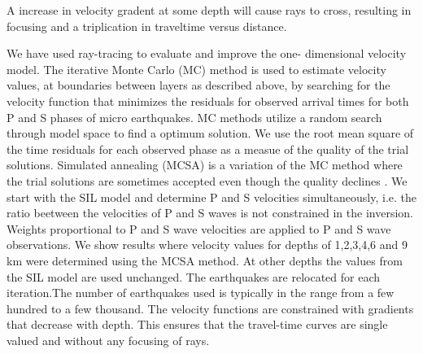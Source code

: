 \documentclass[extra]{gji}
\begin{document}
A increase in velocity gradent at some depth will cause rays to cross, resulting in 
focusing and a triplication in 
traveltime versus distance.

We have  used ray-tracing to evaluate and improve the one-
dimensional velocity model. The iterative Monte Carlo (MC) method is used
to estimate velocity values, at boundaries between layers as described
above, by searching for the velocity function that minimizes the
residuals for observed arrival times for both P and S phases of micro
earthquakes.
MC methods utilize a random search through model space to find a
optimum solution. We use the root mean square of the time
residuals for each observed phase as a measue of the quality of the
trial solutions. Simulated annealing (MCSA) is a variation of the MC
method where the trial solutions are sometimes accepted even though
the quality declines \citep{menke13}.
We start with the SIL model and determine P and S velocities
simultaneously, i.e. the ratio beetween the velocities of P and S waves
is not constrained in the inversion. Weights proportional to P and S
wave velocities are applied to P and S wave observations. We show
results where velocity values for depths of 1,2,3,4,6 and 9 km were
determined using the MCSA method. At other depths the values from
the SIL model are used unchanged. The earthquakes are relocated for
each iteration.The number of earthquakes used is typically in the
range from a few hundred to a few thousand. The velocity functions
are constrained with gradients that decrease with depth. This ensures
that the travel-time curves are single valued and without any focusing
of rays.




\bsp %

\label{lastpage}
\end{document}
